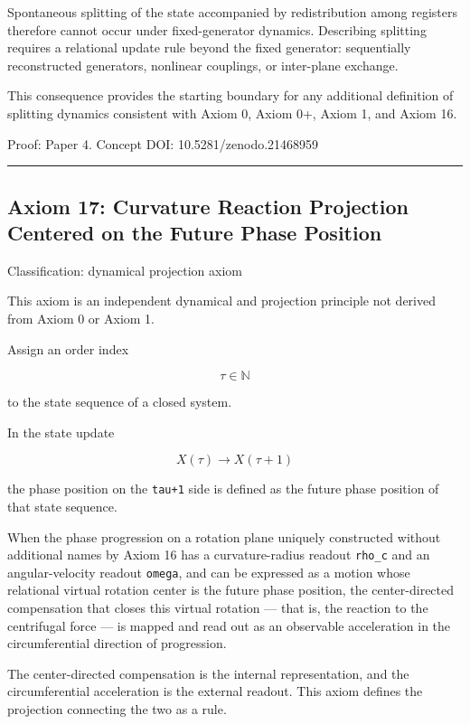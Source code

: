 \documentclass[
  a4paper,
]{article}
\begin{document}
Spontaneous splitting of the state accompanied by redistribution among
registers therefore cannot occur under fixed-generator dynamics.
Describing splitting requires a relational update rule beyond the fixed
generator: sequentially reconstructed generators, nonlinear couplings,
or inter-plane exchange.

This consequence provides the starting boundary for any additional
definition of splitting dynamics consistent with Axiom 0, Axiom 0+,
Axiom 1, and Axiom 16.

Proof: Paper 4. Concept DOI: 10.5281/zenodo.21468959

\begin{center}\rule{0.5\linewidth}{0.5pt}\end{center}

\subsection{Axiom 17: Curvature Reaction Projection Centered on the
Future Phase
Position}\label{axiom-17-curvature-reaction-projection-centered-on-the-future-phase-position}

Classification: dynamical projection axiom

This axiom is an independent dynamical and projection principle not
derived from Axiom 0 or Axiom 1.

Assign an order index

\[
\tau\in\mathbb{N}
\]

to the state sequence of a closed system.

In the state update

\[
X(\tau)\longrightarrow X(\tau+1)
\]

the phase position on the \texttt{tau+1} side is defined as the future
phase position of that state sequence.

When the phase progression on a rotation plane uniquely constructed
without additional names by Axiom 16 has a curvature-radius readout
\texttt{rho\_c} and an angular-velocity readout \texttt{omega}, and can
be expressed as a motion whose relational virtual rotation center is the
future phase position, the center-directed compensation that closes this
virtual rotation --- that is, the reaction to the centrifugal force ---
is mapped and read out as an observable acceleration in the
circumferential direction of progression.

The center-directed compensation is the internal representation, and the
circumferential acceleration is the external readout. This axiom defines
the projection connecting the two as a rule.
\end{document}
